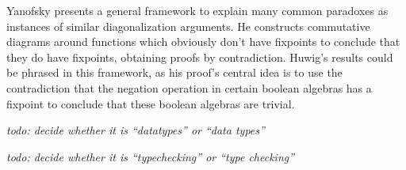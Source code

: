 \documentclass[a4paper]{article}
\newcommand{\todo}[1]{\smallskip \noindent \emph{todo: #1} \smallskip}
\begin{document}
Yanofsky \cite{Yanofsky2003} presents a general framework to explain many common
paradoxes as instances of similar diagonalization arguments. He constructs
commutative diagrams around functions which obviously don't have fixpoints to
conclude that they do have fixpoints, obtaining proofs by contradiction. Huwig's
results \cite{Huwig1990} could be phrased in this framework, as his proof's
central idea is to use the contradiction that the negation operation in certain
boolean algebras has a fixpoint to conclude that these boolean algebras are
trivial.




\todo{decide whether it is ``datatypes'' or ``data types''}

\todo{decide whether it is ``typechecking'' or ``type checking''}
\end{document}

